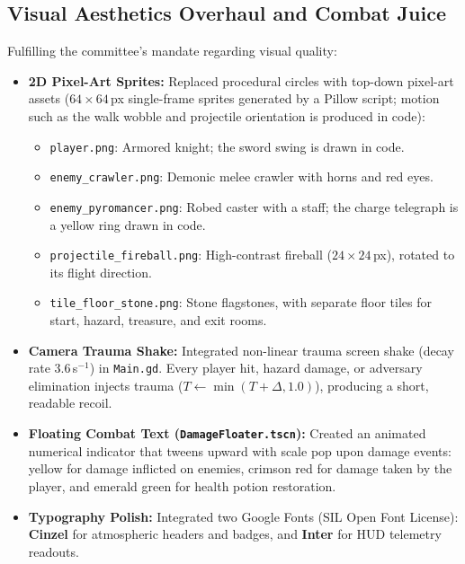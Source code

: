 \subsection{Visual Aesthetics Overhaul and Combat Juice}
Fulfilling the committee's mandate regarding visual quality:
\begin{itemize}
    \item \textbf{2D Pixel-Art Sprites:} Replaced procedural circles with top-down pixel-art assets ($64\times64$\,px single-frame sprites generated by a Pillow script; motion such as the walk wobble and projectile orientation is produced in code):
    \begin{itemize}
        \item \texttt{player.png}: Armored knight; the sword swing is drawn in code.
        \item \texttt{enemy\_crawler.png}: Demonic melee crawler with horns and red eyes.
        \item \texttt{enemy\_pyromancer.png}: Robed caster with a staff; the charge telegraph is a yellow ring drawn in code.
        \item \texttt{projectile\_fireball.png}: High-contrast fireball ($24\times24$\,px), rotated to its flight direction.
        \item \texttt{tile\_floor\_stone.png}: Stone flagstones, with separate floor tiles for start, hazard, treasure, and exit rooms.
    \end{itemize}
    \item \textbf{Camera Trauma Shake:} Integrated non-linear trauma screen shake (decay rate $3.6$\,s$^{-1}$) in \texttt{Main.gd}. Every player hit, hazard damage, or adversary elimination injects trauma ($T \leftarrow \min(T + \Delta, 1.0)$), producing a short, readable recoil.
    \item \textbf{Floating Combat Text (\texttt{DamageFloater.tscn}):} Created an animated numerical indicator that tweens upward with scale pop upon damage events: yellow for damage inflicted on enemies, crimson red for damage taken by the player, and emerald green for health potion restoration.
    \item \textbf{Typography Polish:} Integrated two Google Fonts (SIL Open Font License): \textbf{Cinzel} for atmospheric headers and badges, and \textbf{Inter} for HUD telemetry readouts.
\end{itemize}

